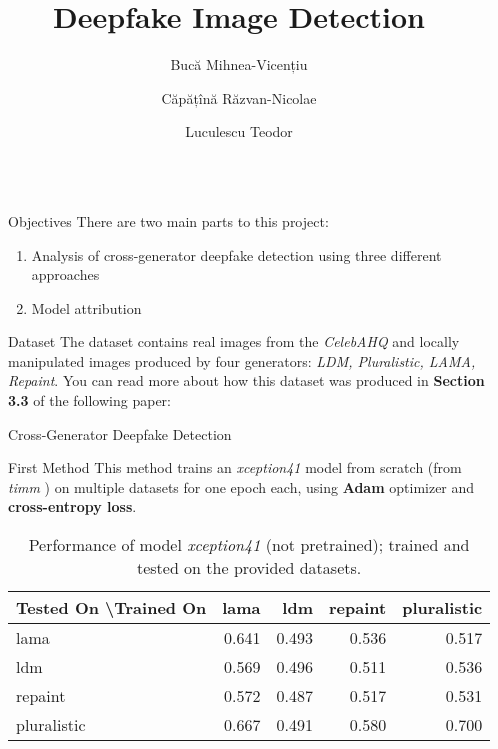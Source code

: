 \documentclass[final]{beamer}
\title{Deepfake Image Detection}
\author{Bucă Mihnea-Vicențiu \and Căpățînă Răzvan-Nicolae \and Luculescu Teodor}
\institute[shortinst]{University of Bucharest, Faculty of Mathematics and Informatics}
\newlength{\sepwidth}
\newlength{\colwidth}
\newcommand{\separatorcolumn}{\begin{column}{\sepwidth}\end{column}}
\begin{document}
\begin{frame}[t]
\begin{columns}[t]
\separatorcolumn
\begin{column}{\colwidth}
  \begin{block}{Objectives}
    There are two main parts to this project:
    \begin{enumerate}
      \item Analysis of cross-generator deepfake detection using three different approaches
      \item Model attribution
    \end{enumerate}
  \end{block}
  
  \begin{block}{Dataset}
  The dataset contains real images from the \textit{CelebAHQ} and locally manipulated images produced by four generators: \textit{LDM, Pluralistic, LAMA, Repaint}. 
  You can read more about how this dataset was produced in \textbf{Section 3.3} of the following paper: \cite{2311.04584}
  \end{block}

  \begin{block}{Cross-Generator Deepfake Detection}
    \begin{block}{First Method}
      This method trains an \textit{xception41} \cite{Timmxception41tf} model from scratch (from \textit{timm} \cite{huggingfaceTimm}) on multiple datasets for one epoch each, using \textbf{Adam} optimizer and \textbf{cross-entropy loss}. 

      \begin{table}
        \centering
        \begin{tabular}{l r r r r}
          \toprule
          \textbf{Tested On \textbackslash Trained On} & \textbf{lama} & \textbf{ldm} & \textbf{repaint} & \textbf{pluralistic} \\
          \midrule
          lama       & 0.641 & 0.493 & 0.536 & 0.517 \\
          ldm        & 0.569 & 0.496 & 0.511 & 0.536 \\
          repaint    & 0.572 & 0.487 & 0.517 & 0.531 \\
          pluralistic & 0.667 & 0.491 & 0.580 & 0.700 \\
          \bottomrule
        \end{tabular}
        \caption{Performance of model \textit{xception41} (not pretrained); trained and tested on the provided datasets.}
      \end{table}
    \end{block}


\end{block}
\end{column}
\end{columns}
\end{frame}
\end{document}
